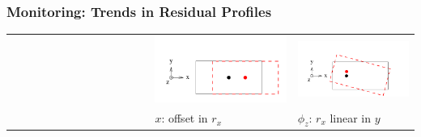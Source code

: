 \documentclass[compress]{beamer}
\begin{document}
\begin{frame}
  \frametitle{Monitoring: Trends in Residual Profiles}

  \vspace{-1 cm}
  \begin{center}

    \begin{tabular}{p{0.35\linewidth} p{0.35\linewidth} p{0.35\linewidth}}
      \begin{minipage}{\linewidth}
      \end{minipage} &
      \begin{minipage}{\linewidth}
	\includegraphics[width=0.8\linewidth]{dof_x}
      \end{minipage} &
      \begin{minipage}{\linewidth}
	\hspace{-0.8 cm}
	\includegraphics[width=0.8\linewidth]{dof_phiz}
      \end{minipage} \\
      \begin{minipage}{\linewidth}
      \end{minipage} &
      \begin{minipage}{\linewidth}
	\hspace{0.4 cm}
	\small $x$: offset in $r_x$
      \end{minipage} &
      \begin{minipage}{\linewidth}
	\hspace{-0.6 cm}
	\small $\phi_z$: $r_x$ linear in $y$

\end{minipage}
\end{tabular}
\end{center}
\end{frame}
\end{document}
